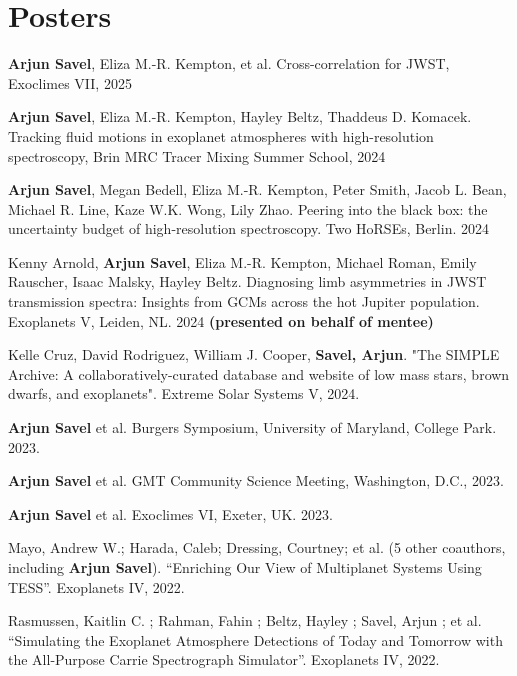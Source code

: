 \documentclass[letterpaper,10.5pt]{article}
\newcommand{\resumeSubHeadingListStart}{\begin{itemize}[leftmargin=*]}
\newcommand{\shorterSection}[1]{\vspace{-10pt}\section{#1}}
\begin{document}
\shorterSection{Posters}
\small
  \begin{list}{}{\cvlist}
    \item[{\color{numcolor}\scriptsize14}] \textbf{Arjun Savel}, Eliza M.-R. Kempton, et al. Cross-correlation for JWST, Exoclimes VII, 2025
  \item[{\color{numcolor}\scriptsize13}] \textbf{Arjun Savel}, Eliza M.-R. Kempton, Hayley Beltz, Thaddeus D. Komacek. Tracking fluid motions in exoplanet atmospheres with high-resolution spectroscopy, Brin MRC Tracer Mixing Summer School, 2024
  \item[{\color{numcolor}\scriptsize12}]\textbf{Arjun Savel}, Megan Bedell, Eliza M.-R. Kempton, Peter Smith, Jacob L. Bean, Michael R. Line, Kaze W.K. Wong, Lily Zhao. Peering into the black box: the uncertainty budget of high-resolution spectroscopy. Two HoRSEs, Berlin. 2024
  \item[{\color{numcolor}\scriptsize11}]Kenny Arnold, \textbf{Arjun Savel}, Eliza M.-R. Kempton, Michael Roman, Emily Rauscher, Isaac Malsky, Hayley Beltz. Diagnosing limb asymmetries in JWST transmission spectra:
 Insights from GCMs across the hot Jupiter population. Exoplanets V, Leiden, NL. 2024 \textbf{(presented on behalf of mentee)}
\item[{\color{numcolor}\scriptsize10}]Kelle Cruz, David Rodriguez, William J. Cooper, \textbf{Savel, Arjun}. "The SIMPLE Archive: A collaboratively-curated database and website of low mass stars, brown dwarfs, and exoplanets". Extreme Solar Systems V, 2024.
  \item[{\color{numcolor}\scriptsize9}]\textbf{Arjun Savel} et al. Burgers Symposium, University of Maryland, College Park. 2023.
  
  \item[{\color{numcolor}\scriptsize8}]\textbf{Arjun Savel} et al. GMT Community Science Meeting, Washington, D.C., 2023.
  
  \item[{\color{numcolor}\scriptsize7}]\textbf{Arjun Savel} et al. Exoclimes VI, Exeter, UK. 2023.

  \item[{\color{numcolor}\scriptsize6}] Mayo, Andrew W.; Harada, Caleb; Dressing, Courtney;  et al. (5 other coauthors, including \textbf{Arjun Savel}). ``Enriching Our View of Multiplanet Systems Using TESS''. Exoplanets IV, 2022.

    \item[{\color{numcolor}\scriptsize5}]Rasmussen, Kaitlin C. ; Rahman, Fahin ; Beltz, Hayley ; Savel, Arjun ; et al. ``Simulating the Exoplanet Atmosphere Detections of Today and Tomorrow with the All-Purpose Carrie Spectrograph Simulator''. Exoplanets IV, 2022.
  

\end{list}
\end{document}
